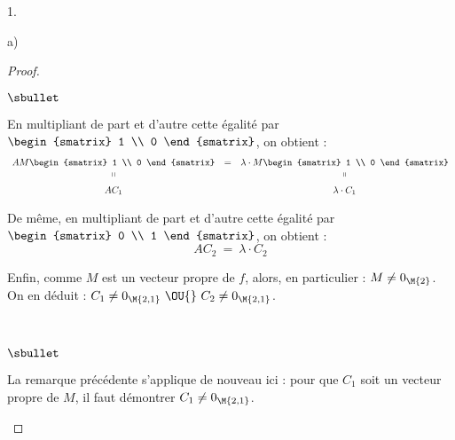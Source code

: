 \documentclass[11pt]{article}%
\begin{document}
\begin{noliste}{1.}
\begin{noliste}{a)}
\begin{proof}
\begin{noliste}{$\sbullet$}
      \item En multipliant de part et d'autre cette égalité par $
        \begin{smatrix}
          1 \\
          0
        \end{smatrix}
        $, on obtient :
        \[
        \begin{array}{ccc}
          AM 
          \begin{smatrix}
            1 \\
            0
          \end{smatrix}
          & = &
          \lambda \cdot M 
          \begin{smatrix}
            1 \\
            0
          \end{smatrix}
          \\
          \shortparallel & & \shortparallel
          \\[.2cm]
          A C_1 & & \lambda \cdot C_1
        \end{array}
        \]


        \newpage


      \item De même, en multipliant de part et d'autre cette égalité par $
        \begin{smatrix}
          0 \\
          1
        \end{smatrix}
        $, on obtient :
        \[
        A C_2 \ = \ \lambda \cdot C_2
        \]

      \item Enfin, comme $M$ est un vecteur propre de $f$, alors, en
        particulier : $M \neq 0_{\M{2}}$.\\
        On en déduit : $C_1 \neq 0_{\M{2,1}} \ \OU{} \ C_2 \neq
        0_{\M{2,1}}$.
      \end{noliste}
      \begin{remark}~
        \begin{noliste}{$\sbullet$}
        \item La remarque précédente s'applique de nouveau ici : pour
          que $C_1$ soit un vecteur propre de $M$, il faut démontrer
          $C_1 \neq 0_{\M{2,1}}$.


\end{noliste}
\end{remark}
\end{proof}
\end{noliste}
\end{noliste}
\end{document}
